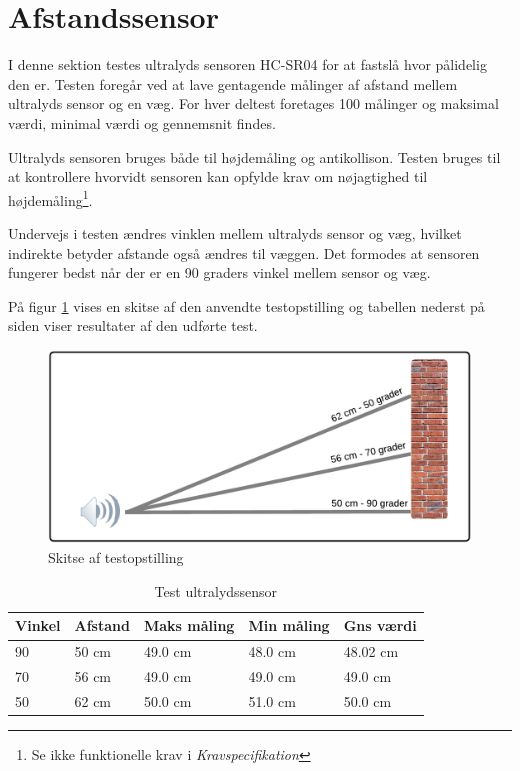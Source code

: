 \section{Afstandssensor}

I denne sektion testes ultralyds sensoren HC-SR04 for at fastslå hvor pålidelig den er. 
Testen foregår ved at lave gentagende målinger af afstand mellem ultralyds sensor og en væg.
For hver deltest foretages 100 målinger og maksimal værdi, minimal værdi og gennemsnit findes. 

Ultralyds sensoren bruges både til højdemåling og antikollison. Testen bruges til at kontrollere hvorvidt sensoren kan opfylde krav om nøjagtighed til højdemåling\footnote{Se ikke funktionelle krav i \textit{Kravspecifikation}}. 

Undervejs i testen ændres vinklen mellem ultralyds sensor og væg, hvilket indirekte betyder afstande også ændres til væggen. Det formodes at sensoren fungerer bedst når der er en 90 graders vinkel mellem sensor og væg. 

På figur \ref{fig:ultra_testopstilling} vises en skitse af den anvendte testopstilling og tabellen nederst på siden viser resultater af den udførte test.

\begin{figure}[H]
\centering
\includegraphics[width=1\textwidth]{Billeder/Test/ultrasound.png}
\caption{Skitse af testopstilling}
\label{fig:ultra_testopstilling}
\end{figure}

\vspace{0.5cm}

\begin{table}[H]
\begin{tabular}{| p{2.5cm}| p{2.5cm}| p{2.5cm}| p{2.5cm}| p{2.5cm}|}
\hline
Vinkel & Afstand & Maks måling & Min måling  & Gns værdi \\ \hline
90 & 50 cm & 49.0 cm & 48.0 cm  & 48.02 cm \\ \hline
70 & 56 cm & 49.0 cm & 49.0 cm  & 49.0 cm \\ \hline
50 & 62 cm & 50.0 cm & 51.0 cm  & 50.0 cm \\ \hline

\end{tabular}
\caption{Test ultralydssensor}
\label{tab:Ultralyds_test}
\end{table}



